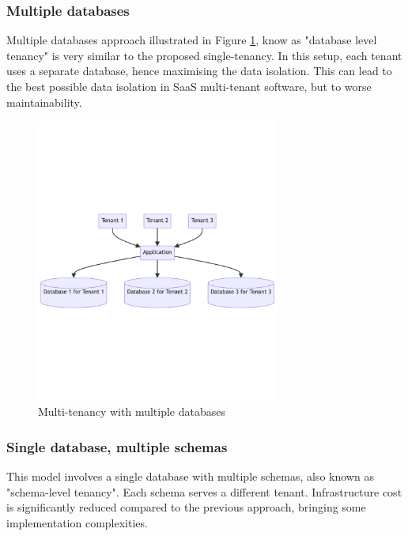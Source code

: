 \subsubsection{Multiple databases}
Multiple databases approach illustrated in Figure \ref{img04:multitenancy-multiple-databases}, know as "database level tenancy" is very similar to the proposed single-tenancy.
In this setup, each tenant uses a separate database, hence maximising the data isolation. 
This can lead to the best possible data isolation in \ac{SaaS} multi-tenant software, but to worse maintainability. 

\begin{figure}[H]\centering
\includegraphics[width=80mm]{img/chap04/fig_multitenancy_multiple_databases.png}
\caption{Multi-tenancy with multiple databases}
\label{img04:multitenancy-multiple-databases}
\end{figure}

\subsubsection{Single database, multiple schemas}

This model involves a single database with multiple schemas, also known as "schema-level tenancy".
Each schema serves a different tenant.
Infrastructure cost is significantly reduced compared to the previous approach, bringing some implementation complexities.


